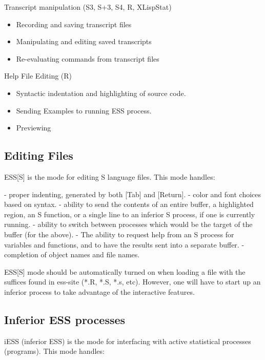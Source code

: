 \documentclass{article}
\begin{document}
Transcript manipulation (S3, S+3, S4, R, XLispStat)
\begin{itemize}
\item Recording and saving transcript files
\item Manipulating and editing saved transcripts
\item Re-evaluating commands from transcript files
\end{itemize}

Help File Editing (R)
\begin{itemize}
\item Syntactic indentation and highlighting of source code.
\item Sending Examples to running ESS process.
\item Previewing
\end{itemize}



\subsection{Editing Files}
\label{sec:basic:edit}


ESS[S] is the mode for editing S language files.  This mode handles:

- proper indenting, generated by both [Tab] and [Return].
- color and font choices based on syntax.
- ability to send the contents of an entire buffer, a highlighted
  region, an S function, or a single line to an inferior S process, if
  one is currently running.
- ability to switch between processes which would be the target of the 
  buffer (for the above).
- The ability to request help from an S process for variables and
  functions, and to have the results sent into a separate buffer.
- completion of object names and file names.

ESS[S] mode should be automatically turned on when loading a file with
the suffices found in ess-site (*.R, *.S, *.s, etc).  However, one
will have to start up an inferior process to take advantage of the
interactive features.


\subsection{Inferior ESS processes}
\label{sec:basic:inf}

iESS (inferior ESS) is the mode for interfacing with active
statistical processes (programs).  This mode handles:
\end{document}
